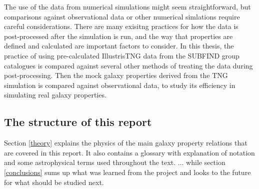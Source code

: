 The use of the data from numerical simulations might seem straightforward, but comparisons against observational data or other numerical simlations require careful considerations. There are many exisitng practices for how the data is post-processed after the simulation is run, and the way that properties are defined and calculated are important factors to consider. In this thesis, the practice of using pre-calculated IllustrisTNG data from the SUBFIND group catalogues is compared against several other methods of treating the data during post-processing. Then the mock galaxy properties derived from the TNG simulation is compared against observational data, to study its efficiency in simulating real galaxy properties.

\subsection{The structure of this report}
Section \ref{theory} explains the physics of the main galaxy property relations that are covered in this report. It also contains a glossary with explanation of notation and some astrophysical terms used throughout the text. ... while section \ref{conclusions} sums up what was learned from the project and looks to the future for what should be studied next.